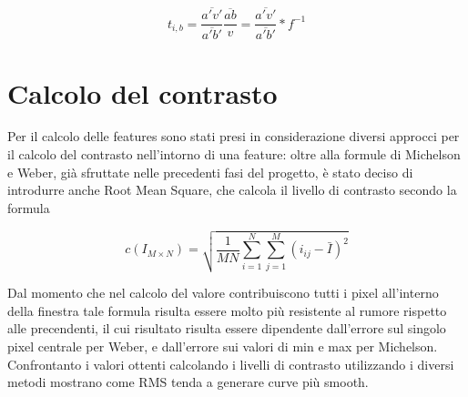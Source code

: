 \documentclass[12pt]{report}
\begin{document}
$$ t_{i,b} = \frac{\overline{a'v'}}{\overline{a'b'}}\frac{\overline{ab}}{v} = \frac{\overline{a'v'}}{\overline{a'b'}}*f^{-1} $$

\section{Calcolo del contrasto}
\noindent Per il calcolo delle features sono stati presi in considerazione diversi approcci per il calcolo del contrasto nell'intorno di una feature: oltre alla formule di Michelson e Weber, gi\`a sfruttate nelle precedenti fasi del progetto, \`e stato deciso di introdurre anche Root Mean Square, che calcola il livello di contrasto secondo la formula

$$ c\left(I_{M\times N}\right) = \sqrt{\frac{1}{MN}\sum_{i=1}^N\sum_{j=1}^M(i_{ij}-\bar{I})^2} $$

\noindent Dal momento che nel calcolo del valore contribuiscono tutti i pixel all'interno della finestra tale formula risulta essere molto pi\`u resistente al rumore rispetto alle precendenti, il cui risultato risulta essere dipendente dall'errore sul singolo pixel centrale per Weber, e dall'errore sui valori di min e max per Michelson.\\
Confrontanto i valori ottenti calcolando i livelli di contrasto utilizzando i diversi metodi mostrano come RMS tenda a generare curve pi\`u smooth.
\end{document}
